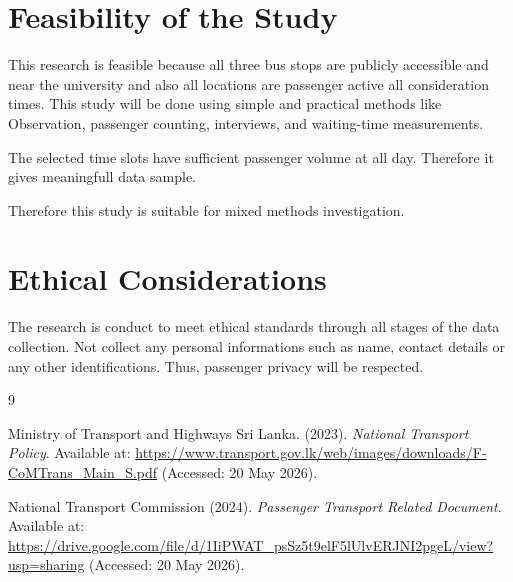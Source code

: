 \documentclass[12pt,a4paper]{report}
\begin{document}
\section{Feasibility of the Study}

This research is feasible because all three bus stops are publicly accessible and near the university and also all locations are passenger active all consideration times. 
This study will be done using simple and practical methods like Observation, passenger counting, interviews, and waiting-time measurements. 

The selected time slots have sufficient passenger volume at all day. Therefore it gives meaningfull data sample.

Therefore this study is suitable for mixed methods investigation.


\section{Ethical Considerations}

The research is conduct to meet ethical standards through all stages of the data collection. Not collect any personal informations such as name, contact details or any other identifications. Thus, passenger privacy will be respected.



\clearpage
\renewcommand{\bibname}{References}

\begin{thebibliography}{9}

Ministry of Transport and Highways Sri Lanka. (2023). 
\textit{National Transport Policy}. Available at: 
\url{https://www.transport.gov.lk/web/images/downloads/F-CoMTrans_Main_S.pdf}
(Accessed: 20 May 2026).

National Transport Commission (2024). 
\textit{Passenger Transport Related Document}. Available at: 
\url{https://drive.google.com/file/d/1IiPWAT_psSz5t9elF5lUlvERJNI2pgeL/view?usp=sharing}
(Accessed: 20 May 2026).

\end{thebibliography}
\end{document}
